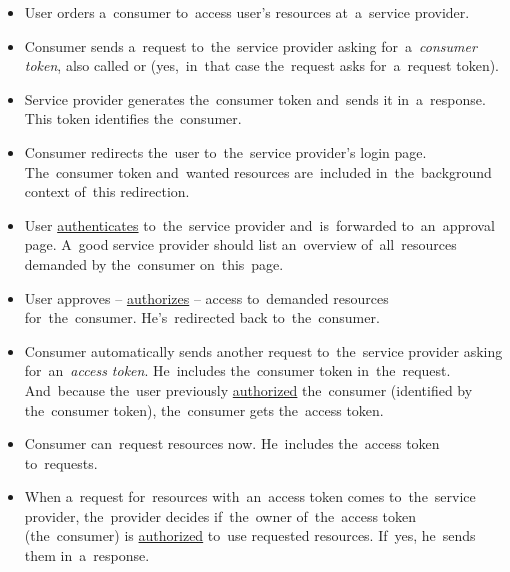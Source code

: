\begin{itemize}
    \item User orders a~consumer to~access user's resources at~a~service provider.
    \item Consumer sends a~request to~the~service provider asking for~a~\textit{consumer token}, also called  or  (yes,~in~that case the~request asks for~a~request token).
    \item Service provider generates the~consumer token and~sends it in~a~response.
          This token identifies the~consumer.
    \item Consumer redirects the~user to~the~service provider's login page.
          The~consumer token and~wanted resources are~included in~the~background context of~this redirection.
    \item User \hyperref[authenticationauthorization]{authenticates} to~the~service provider and~is~forwarded to~an~approval page.
          A~good service provider should list an~overview of~all~resources demanded by the~consumer on~this~page.
    \item User approves -- \hyperref[authenticationauthorization]{authorizes} -- access to~demanded resources for~the~consumer.
          He's~redirected back to~the~consumer.
    \item Consumer automatically sends another request to~the~service provider asking for~an~\textit{access token}.
          He~includes the~consumer token in~the~request.
          And~because the~user previously \hyperref[authenticationauthorization]{authorized} the~consumer (identified by the~consumer token), the~consumer gets the~access token.
    \item Consumer can~request resources now.
          He~includes the~access token to~requests.
    \item When a~request for~resources with~an~access token comes to~the~service provider, the~provider decides if~the~owner of~the~access token (the~consumer) is \hyperref[authenticationauthorization]{authorized} to~use requested resources.
          If~yes, he~sends them in~a~response.
\end{itemize}

